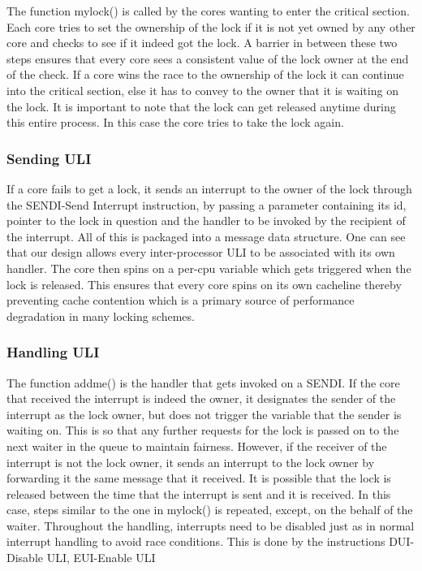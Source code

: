 The function mylock() is called by the cores wanting to enter the critical
section. Each core tries to set the ownership of the lock if it is not yet owned
by any other core and checks to see if it indeed got the lock. A barrier in
between these two steps ensures that every core sees a consistent value of the
lock owner at the end of the check. If a core wins the race to the ownership of
the lock it can continue into the critical section, else it has to convey to the
owner that it is waiting on the lock. It is important to note that the lock can
get released anytime during this entire process. In this case the core tries to
take the lock again.

\subsubsection{Sending ULI}

If a core fails to get a lock, it sends an interrupt to the owner of the lock
through the SENDI-Send Interrupt instruction, by passing a parameter containing
its id, pointer to the lock in question and the handler to be invoked by the
recipient of the interrupt. All of this is packaged into a message data
structure. One can see that our design allows every inter-processor ULI to be
associated with its own handler.  The core then spins on a per-cpu variable
which gets triggered when the lock is released. This ensures that every core
spins on its own cacheline thereby preventing cache contention which is a
primary source of performance degradation in many locking schemes.

\subsubsection{Handling ULI}

The function addme() is the handler that gets invoked on a SENDI. If the core
that received the interrupt is indeed the owner, it designates the sender of the
interrupt as the lock owner, but does not trigger the variable that the sender
is waiting on. This is so that any further requests for the lock is passed on to
the next waiter in the queue to maintain fairness. However, if the receiver of
the interrupt is not the lock owner, it sends an interrupt to the lock owner by
forwarding it the same message that it received. It is possible that the lock is
released between the time that the interrupt is sent and it is received. In this
case, steps similar to the one in mylock() is repeated, except, on the behalf of
the waiter. Throughout the handling, interrupts need to be disabled just as in
normal interrupt handling to avoid race conditions. This is done by the
instructions DUI-Disable ULI, EUI-Enable ULI

